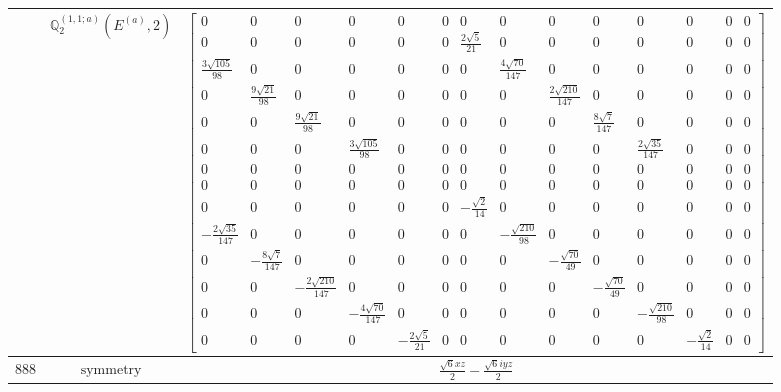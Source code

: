 \documentclass[fleqn,8pt,landscape]{jsarticle}
\begin{document}
\begin{longtable}{ccc}
$  $ & $ \mathbb{Q}_{2}^{(1,1;a)}(E^{(a)},2) $ & $ \begin{bmatrix} 0 & 0 & 0 & 0 & 0 & 0 & 0 & 0 & 0 & 0 & 0 & 0 & 0 & 0 \\ 0 & 0 & 0 & 0 & 0 & 0 & \frac{2 \sqrt{5}}{21} & 0 & 0 & 0 & 0 & 0 & 0 & 0 \\ \frac{3 \sqrt{105}}{98} & 0 & 0 & 0 & 0 & 0 & 0 & \frac{4 \sqrt{70}}{147} & 0 & 0 & 0 & 0 & 0 & 0 \\ 0 & \frac{9 \sqrt{21}}{98} & 0 & 0 & 0 & 0 & 0 & 0 & \frac{2 \sqrt{210}}{147} & 0 & 0 & 0 & 0 & 0 \\ 0 & 0 & \frac{9 \sqrt{21}}{98} & 0 & 0 & 0 & 0 & 0 & 0 & \frac{8 \sqrt{7}}{147} & 0 & 0 & 0 & 0 \\ 0 & 0 & 0 & \frac{3 \sqrt{105}}{98} & 0 & 0 & 0 & 0 & 0 & 0 & \frac{2 \sqrt{35}}{147} & 0 & 0 & 0 \\ 0 & 0 & 0 & 0 & 0 & 0 & 0 & 0 & 0 & 0 & 0 & 0 & 0 & 0 \\ 0 & 0 & 0 & 0 & 0 & 0 & 0 & 0 & 0 & 0 & 0 & 0 & 0 & 0 \\ 0 & 0 & 0 & 0 & 0 & 0 & - \frac{\sqrt{2}}{14} & 0 & 0 & 0 & 0 & 0 & 0 & 0 \\ - \frac{2 \sqrt{35}}{147} & 0 & 0 & 0 & 0 & 0 & 0 & - \frac{\sqrt{210}}{98} & 0 & 0 & 0 & 0 & 0 & 0 \\ 0 & - \frac{8 \sqrt{7}}{147} & 0 & 0 & 0 & 0 & 0 & 0 & - \frac{\sqrt{70}}{49} & 0 & 0 & 0 & 0 & 0 \\ 0 & 0 & - \frac{2 \sqrt{210}}{147} & 0 & 0 & 0 & 0 & 0 & 0 & - \frac{\sqrt{70}}{49} & 0 & 0 & 0 & 0 \\ 0 & 0 & 0 & - \frac{4 \sqrt{70}}{147} & 0 & 0 & 0 & 0 & 0 & 0 & - \frac{\sqrt{210}}{98} & 0 & 0 & 0 \\ 0 & 0 & 0 & 0 & - \frac{2 \sqrt{5}}{21} & 0 & 0 & 0 & 0 & 0 & 0 & - \frac{\sqrt{2}}{14} & 0 & 0 \end{bmatrix} $ \\ \hline
$ 888 $ & $ \text{symmetry} $ & $ \frac{\sqrt{6} x z}{2} - \frac{\sqrt{6} i y z}{2} $ \\

\end{longtable}
\end{document}
